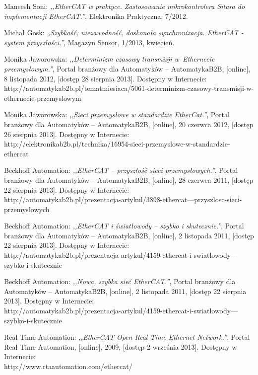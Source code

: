 \begin{thebibliography}{99}
Maneesh Soni:
\emph{,,EtherCAT w praktyce. Zastosowanie mikrokontrolera Sitara do implementacji EtherCAT.''},
Elektronika Praktyczna, 7/2012.

Michał Gosk:
\emph{„Szybkość, niezawodność, doskonała synchronizacja. EtherCAT - system przyszłości.”},
Magazyn Sensor, 1/2013, kwiecień.

Monika Jaworowska:
\emph{,,Determinizm czasowy transmisji w~Ethernecie przemysłowym.''},
Portal branżowy dla Automatyków -- AutomatykaB2B, 
[online],
8 listopada 2012,
[dostęp 28 sierpnia 2013].
Dostępny w Internecie: \\
http://automatykab2b.pl/tematmiesiaca/5061-determinizm-czasowy-transmisji-w-ethernecie-przemyslowym

Monika Jaworowska:
\emph{,,Sieci przemysłowe w standardzie EtherCat.''},
Portal branżowy dla Automatyków -- AutomatykaB2B, 
[online],
20 czerwca 2012,
[dostęp 26 sierpnia 2013].
Dostępny w Internecie: \\
http://elektronikab2b.pl/technika/16954-sieci-przemyslowe-w-standardzie-ethercat

Beckhoff Automation:
\emph{,,EtherCAT -- przyszłość sieci przemysłowych.''},
Portal branżowy dla Automatyków -- AutomatykaB2B, 
[online],
28 czerwca 2011,
[dostęp 22 sierpnia 2013].
Dostępny w Internecie: \\
http://automatykab2b.pl/prezentacja-artykul/3898-ethercat---przyszlosc-sieci-przemyslowych

Beckhoff Automation:
\emph{,,EtherCAT i światłowody -- szybko i skutecznie.''},
Portal branżowy dla Automatyków -- AutomatykaB2B, 
[online],
2 listopada 2011,
[dostęp 22 sierpnia 2013].
Dostępny w Internecie: \\
http://automatykab2b.pl/prezentacja-artykul/4159-ethercat-i-swiatlowody---szybko-i-skutecznie

Beckhoff Automation:
\emph{,,Nowa, szybka sieć EtherCAT.''},
Portal branżowy dla Automatyków -- AutomatykaB2B, 
[online],
2 listopada 2011,
[dostęp 22 sierpnia 2013].
Dostępny w Internecie: \\
http://automatykab2b.pl/prezentacja-artykul/4159-ethercat-i-swiatlowody---szybko-i-skutecznie

Real Time Automation:
\emph{,,EtherCAT Open Real-Time Ethernet Network.''},
Portal Real Time Automation, 
[online],
2009,
[dostęp 2 września 2013].
Dostępny w Internecie: \\
http://www.rtaautomation.com/ethercat/


\end{thebibliography}
